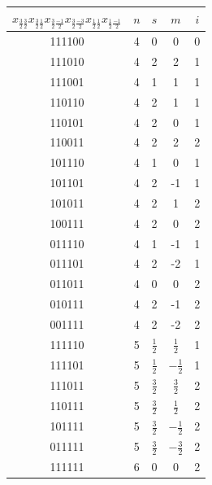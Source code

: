 \documentclass{article}
\begin{document}
   \begin{tabular}{|c|c|c|c|c|}
   \hline
       $x_{\frac{3}{2}\frac{3}{2}}x_{\frac{3}{2}\frac{1}{2}}x_{\frac{3}{2}\frac{-1}{2}}x_{\frac{3}{2}\frac{-3}{2}}x_{\frac{1}{2}\frac{1}{2}}x_{\frac{1}{2}\frac{-1}{2}}$ &$n$& $s$&$m$&$i$  \\ \hline
       111100 & 4& 0&0&0 \\\hline
       111010 & 4&2 &2&1 \\\hline
       111001 & 4& 1&1&1 \\\hline
       110110 & 4&2 &1&1 \\\hline
       110101 & 4&2 &0&1 \\\hline
       110011 & 4& 2&2&2 \\\hline
       101110 & 4& 1&0&1 \\\hline
       101101 & 4&2 &-1&1 \\\hline
       101011 & 4& 2&1&2 \\\hline
       100111 & 4&2 &0&2 \\\hline
       011110 & 4&1 &-1&1 \\\hline
       011101 & 4& 2&-2&1 \\\hline
       011011 & 4& 0&0&2 \\\hline
       010111 & 4& 2&-1&2 \\\hline
       001111 & 4&2 &-2&2 \\\hline
       111110 & 5&$\frac{1}{2}$ &$\frac{1}{2}$&1 \\\hline
       111101 & 5&$\frac{1}{2}$ &$-\frac{1}{2}$&1 \\\hline
       111011 & 5&$\frac{3}{2}$ &$\frac{3}{2}$&2 \\\hline
       110111 & 5&$\frac{3}{2}$ &$\frac{1}{2}$&2 \\\hline
       101111 & 5&$\frac{3}{2}$ &$-\frac{1}{2}$&2 \\\hline
       011111 & 5& $\frac{3}{2}$&$-\frac{3}{2}$&2 \\\hline
       111111 & 6&0 &0&2 \\\hline
   \end{tabular}
\end{document}
